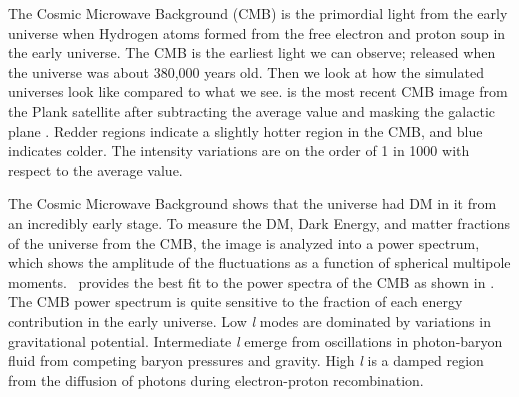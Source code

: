 The Cosmic Microwave Background (CMB) is the primordial light from the early universe when Hydrogen atoms formed from the free electron and proton soup in the early universe.
The CMB is the earliest light we can observe; released when the universe was about 380,000 years old.
Then we look at how the simulated universes look like compared to what we see.
 is the most recent CMB image from the Plank satellite after subtracting the average value and masking the galactic plane \cite{Plank:CMB}.
Redder regions indicate a slightly hotter region in the CMB, and blue indicates colder.
The intensity variations are on the order of 1 in 1000 with respect to the average value.

\begin{figure}[ht]
\end{figure}

The Cosmic Microwave Background shows that the universe had DM in it from an incredibly early stage.
To measure the DM, Dark Energy, and matter fractions of the universe from the CMB, the image is analyzed into a power spectrum, which shows the amplitude of the fluctuations as a function of spherical multipole moments.
\lcdm~provides the best fit to the power spectra of the CMB as shown in .
The CMB power spectrum is quite sensitive to the fraction of each energy contribution in the early universe.
Low \textit{l} modes are dominated by variations in gravitational potential.
Intermediate \textit{l} emerge from oscillations in photon-baryon fluid from competing baryon pressures and gravity.
High \textit{l} is a damped region from the diffusion of photons during electron-proton recombination. \cite{Greene:cosmology_dm}


